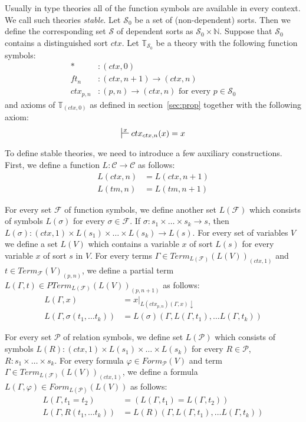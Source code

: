 \documentclass[reqno]{amsart}
\theoremstyle{definition}
\theoremstyle{remark}
\newcommand{\emptyCtx}{*}
\numberwithin{figure}{section}
\begin{document}
Usually in type theories all of the function symbols are available in every context.
We call such theories \emph{stable}.
Let $\mathcal{S}_0$ be a set of (non-dependent) sorts.
Then we define the corresponding set $\mathcal{S}$ of dependent sorts as $\mathcal{S}_0 \times \mathbb{N}$.
Suppose that $\mathcal{S}_0$ contains a distinguished sort $ctx$.
Let $\mathbb{T}_{\mathcal{S}_0}$ be a theory with the following function symbols:
\begin{align*}
\emptyCtx  &: (ctx,0) \\
ft_n & : (ctx,n+1) \to (ctx,n) \\
ctx_{p,n} & : (p,n) \to (ctx,n) \text{ for every } p \in \mathcal{S}_0
\end{align*}
and axioms of $\mathbb{T}_{(ctx,0)}$ as defined in section~\ref{sec:prop} together with the following axiom:
\[ \sststile{}{x} ctx_{ctx,n}(x) = x \]

To define stable theories, we need to introduce a few auxiliary constructions.
First, we define a function $L : \mathcal{C} \to \mathcal{C}$ as follows:
\begin{align*}
L(ctx,n) & = L(ctx,n+1) \\
L(tm,n) & = L(tm,n+1)
\end{align*}

For every set $\mathcal{F}$ of function symbols, we define another set $L(\mathcal{F})$ which consists of symbols $L(\sigma)$ for every $\sigma \in \mathcal{F}$.
If $\sigma : s_1 \times \ldots \times s_k \to s$, then $L(\sigma) : (ctx,1) \times L(s_1) \times \ldots \times L(s_k) \to L(s)$.
For every set of variables $V$ we define a set $L(V)$ which contains a variable $x$ of sort $L(s)$ for every variable $x$ of sort $s$ in $V$.
For every terms $\Gamma \in Term_{L(\mathcal{F})}(L(V))_{(ctx,1)}$ and $t \in Term_{\mathcal{F}}(V)_{(p,n)}$,
we define a partial term $L(\Gamma,t) \in PTerm_{L(\mathcal{F})}(L(V))_{(p,n+1)}$ as follows:
\begin{align*}
L(\Gamma, x) & = x|_{L(ctx_{p,n})(\Gamma, x) \downarrow} \\
L(\Gamma, \sigma(t_1, \ldots t_k)) & = L(\sigma)(\Gamma, L(\Gamma, t_1), \ldots L(\Gamma, t_k))
\end{align*}

For every set $\mathcal{P}$ of relation symbols, we define set $L(\mathcal{P})$ which consists of symbols
    $L(R) : (ctx,1) \times L(s_1) \times \ldots \times L(s_k)$ for every $R \in \mathcal{P}$, $R : s_1 \times \ldots \times s_k$.
For every formula $\varphi \in Form_\mathcal{P}(V)$ and term $\Gamma \in Term_{L(\mathcal{F})}(L(V))_{(ctx,1)}$,
we define a formula $L(\Gamma, \varphi) \in Form_{L(\mathcal{P})}(L(V))$ as follows:
\begin{align*}
L(\Gamma, t_1 = t_2) & = (L(\Gamma, t_1) = L(\Gamma, t_2)) \\
L(\Gamma, R(t_1, \ldots t_k)) & = L(R)(\Gamma, L(\Gamma, t_1), \ldots L(\Gamma, t_k))
\end{align*}
\end{document}
